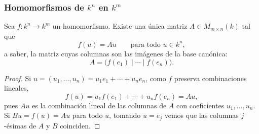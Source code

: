 
\begin{frame}[allowframebreaks, t]
    \frametitle{Homomorfismos de $k^n$ en $k^m$}

    \begin{theorem}
        Sea $f\colon k^n\to k^m$ un homomorfismo. Existe una única matriz
        $A\in M_{m\times n}(k)$ tal que
        \[
            f(u)=Au\qquad\text{para todo }u\in k^n,
        \]
        a saber, la matriz cuyas columnas son las imágenes de la base
        canónica:
        \[
            A=\bigl(f(e_1)\mid\cdots\mid f(e_n)\bigr).
        \]
    \end{theorem}

    \framebreak

    \begin{proof}
        Si $u=(u_1,\ldots,u_n)=u_1e_1+\cdots+u_ne_n$, como $f$ preserva
        combinaciones lineales,
        \[
            f(u)=u_1f(e_1)+\cdots+u_nf(e_n)=Au,
        \]
        pues $Au$ es la combinación lineal de las columnas de $A$ con
        coeficientes $u_1,\ldots,u_n$. Si $Bu=f(u)=Au$ para todo $u$,
        tomando $u=e_j$ vemos que las columnas $j$-ésimas de $A$ y $B$
        coinciden.
    \end{proof}
\end{frame}


